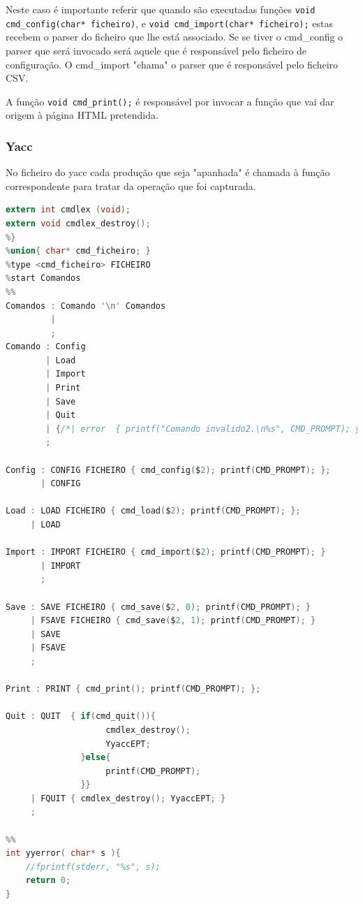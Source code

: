 \documentclass[11pt, a4paper, oneside]{article}
\begin{document}
Neste caso é importante referir que quando são executadas funções \texttt{void cmd\_config(char* ficheiro)}, e \texttt{void cmd\_import(char* ficheiro);} estas recebem o parser do ficheiro que lhe está associado. Se se tiver o cmd\_config o parser que será invocado será aquele que é responsável pelo ficheiro de configuração. O cmd\_import "chama" o parser que é responsável pelo ficheiro CSV.

A função \texttt{void cmd\_print();} é responsável por invocar a função que vai dar origem à página \textsf{HTML} pretendida.
\subsubsection{\textsf{Yacc}}

No ficheiro do \textsf{yacc} cada produção que seja "apanhada" é chamada à função correspondente para tratar da operação que foi capturada.

\begin{lstlisting}[language=C, caption={yacc do ficheiro cmd.}]
extern int cmdlex (void);
extern void cmdlex_destroy();
%}
%union{ char* cmd_ficheiro; }
%type <cmd_ficheiro> FICHEIRO
%start Comandos
%%
Comandos : Comando '\n' Comandos
         | 
         ;
Comando : Config
        | Load
        | Import
        | Print
        | Save
        | Quit
        | {/*| error  { printf("Comando invalido2.\n%s", CMD_PROMPT); yyclearin; yyerrok; }*/}
        ;

Config : CONFIG FICHEIRO { cmd_config($2); printf(CMD_PROMPT); };
       | CONFIG

Load : LOAD FICHEIRO { cmd_load($2); printf(CMD_PROMPT); };
     | LOAD

Import : IMPORT FICHEIRO { cmd_import($2); printf(CMD_PROMPT); }
       | IMPORT
       ;

Save : SAVE FICHEIRO { cmd_save($2, 0); printf(CMD_PROMPT); }
     | FSAVE FICHEIRO { cmd_save($2, 1); printf(CMD_PROMPT); }
     | SAVE
     | FSAVE
     ;

Print : PRINT { cmd_print(); printf(CMD_PROMPT); };

Quit : QUIT  { if(cmd_quit()){
                    cmdlex_destroy();
                    YyaccEPT;
               }else{
                    printf(CMD_PROMPT);
               }}
     | FQUIT { cmdlex_destroy(); YyaccEPT; }
     ;

%%
int yyerror( char* s ){
    //fprintf(stderr, "%s", s);
    return 0;
}
\end{lstlisting} 
\end{document}
